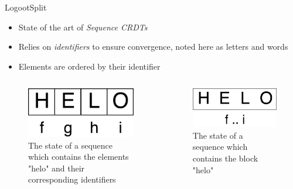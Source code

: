\documentclass[10pt]{beamer}
\begin{document}
\begin{frame}{LogootSplit \cite{AndreCollaborateCom2013}}
  \begin{itemize}
    \item State of the art of \emph{Sequence \acp{CRDT}}
    \item Relies on \emph{identifiers} to ensure convergence, noted here as letters and words
    \item Elements are ordered by their identifier
  \end{itemize}

  \pause

  \begin{columns}
    \begin{column}{0.5\textwidth}
      \begin{figure}
        \includegraphics[scale=0.15]{img/helo-as-letters.png}
        \caption{The state of a sequence which contains the elements "helo" and their corresponding identifiers}
      \end{figure}
    \end{column}
    \pause
    \begin{column}{0.5\textwidth}
      \begin{figure}
        \includegraphics[scale=0.15]{img/helo-as-block.png}
        \caption{The state of a sequence which contains the block "helo"}
      \end{figure}
    \end{column}
  \end{columns}
\end{frame}
\end{document}
